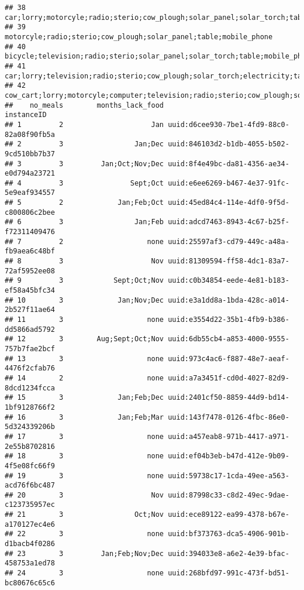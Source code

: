 \documentclass[
]{article}
\begin{document}
\begin{verbatim}
## 38                car;lorry;motorcyle;radio;sterio;cow_plough;solar_panel;solar_torch;table;sofa_set;mobile_phone;fridge
## 39                                                      motorcyle;radio;sterio;cow_plough;solar_panel;table;mobile_phone
## 40                                            bicycle;television;radio;sterio;solar_panel;solar_torch;table;mobile_phone
## 41               car;lorry;television;radio;sterio;cow_plough;solar_torch;electricity;table;sofa_set;mobile_phone;fridge
## 42 cow_cart;lorry;motorcyle;computer;television;radio;sterio;cow_plough;solar_panel;solar_torch;electricity;mobile_phone
##    no_meals        months_lack_food                                instanceID
## 1         2                     Jan uuid:d6cee930-7be1-4fd9-88c0-82a08f90fb5a
## 2         3                 Jan;Dec uuid:846103d2-b1db-4055-b502-9cd510bb7b37
## 3         3         Jan;Oct;Nov;Dec uuid:8f4e49bc-da81-4356-ae34-e0d794a23721
## 4         3                Sept;Oct uuid:e6ee6269-b467-4e37-91fc-5e9eaf934557
## 5         2             Jan;Feb;Oct uuid:45ed84c4-114e-4df0-9f5d-c800806c2bee
## 6         3                 Jan;Feb uuid:adcd7463-8943-4c67-b25f-f72311409476
## 7         2                    none uuid:25597af3-cd79-449c-a48a-fb9aea6c48bf
## 8         3                     Nov uuid:81309594-ff58-4dc1-83a7-72af5952ee08
## 9         3            Sept;Oct;Nov uuid:c0b34854-eede-4e81-b183-ef58a45bfc34
## 10        3             Jan;Nov;Dec uuid:e3a1dd8a-1bda-428c-a014-2b527f11ae64
## 11        3                    none uuid:e3554d22-35b1-4fb9-b386-dd5866ad5792
## 12        3        Aug;Sept;Oct;Nov uuid:6db55cb4-a853-4000-9555-757b7fae2bcf
## 13        3                    none uuid:973c4ac6-f887-48e7-aeaf-4476f2cfab76
## 14        2                    none uuid:a7a3451f-cd0d-4027-82d9-8dcd1234fcca
## 15        3             Jan;Feb;Dec uuid:2401cf50-8859-44d9-bd14-1bf9128766f2
## 16        3             Jan;Feb;Mar uuid:143f7478-0126-4fbc-86e0-5d324339206b
## 17        3                    none uuid:a457eab8-971b-4417-a971-2e55b8702816
## 18        3                    none uuid:ef04b3eb-b47d-412e-9b09-4f5e08fc66f9
## 19        3                    none uuid:59738c17-1cda-49ee-a563-acd76f6bc487
## 20        3                     Nov uuid:87998c33-c8d2-49ec-9dae-c123735957ec
## 21        3                 Oct;Nov uuid:ece89122-ea99-4378-b67e-a170127ec4e6
## 22        3                    none uuid:bf373763-dca5-4906-901b-d1bacb4f0286
## 23        3         Jan;Feb;Nov;Dec uuid:394033e8-a6e2-4e39-bfac-458753a1ed78
## 24        3                    none uuid:268bfd97-991c-473f-bd51-bc80676c65c6

\end{verbatim}
\end{document}
